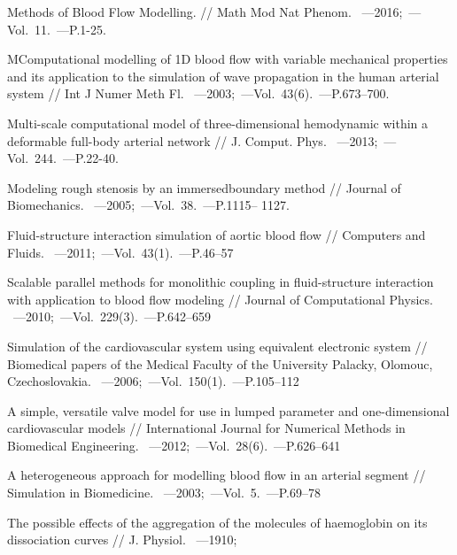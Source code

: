 \begin{thebibliography}{}
      Methods of Blood Flow Modelling. // Math Mod Nat Phenom. ~---2016;~---Vol.~11.~---P.1-25.
    
      MComputational modelling of 1D blood
flow with variable mechanical properties and its application to the simulation
of wave propagation in the human arterial system // Int J Numer Meth Fl. ~---2003;~---Vol.~43(6).~---P.673–700.

      Multi-scale computational model of
three-dimensional hemodynamic within a deformable full-body arterial network // J. Comput. Phys. ~---2013;~---Vol.~244.~---P.22-40.

      Modeling rough stenosis by an immersedboundary
method // Journal of Biomechanics. ~---2005;~---Vol.~38.~---P.1115–
1127.

      Fluid-structure interaction simulation
of aortic blood flow // Computers and Fluids. ~---2011;~---Vol.~43(1).~---P.46–57

      Scalable parallel methods for monolithic coupling in
fluid-structure interaction with application to blood flow modeling // Journal
of Computational Physics. ~---2010;~---Vol.~229(3).~---P.642–659

      Simulation of the cardiovascular
system using equivalent electronic system // Biomedical papers of the Medical
Faculty of the University Palacky, Olomouc, Czechoslovakia. ~---2006;~---Vol.~150(1).~---P.105–112
      
     A simple, versatile
valve model for use in lumped parameter and one-dimensional cardiovascular
models // International Journal for Numerical Methods in Biomedical Engineering. ~---2012;~---Vol.~28(6).~---P.626–641

     A heterogeneous approach for modelling blood flow in an arterial segment // Simulation in
Biomedicine. ~---2003;~---Vol.~5.~---P.69–78

     The possible effects of the aggregation of
the molecules of haemoglobin on its dissociation curves // J. Physiol. ~---1910;


\end{thebibliography}
